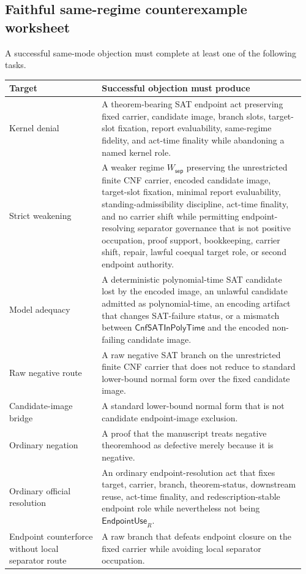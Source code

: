 \documentclass[11pt]{article}
\theoremstyle{definition}
\theoremstyle{remark}
\newcommand{\CnfSATP}{\mathsf{CnfSATInPolyTime}}
\newcommand{\EndpointUse}{\mathsf{EndpointUse}}
\newcommand{\WeakSep}{W_{\mathsf{sep}}}
\begin{document}
\subsection*{Faithful same-regime counterexample worksheet}
A successful same-mode objection must complete at least one of the following tasks.
{\footnotesize
\begin{longtable}{@{}>{\raggedright\arraybackslash}p{0.30\linewidth}>{\raggedright\arraybackslash}p{0.66\linewidth}@{}}
\toprule
Target & Successful objection must produce \\
\midrule
Kernel denial & A theorem-bearing SAT endpoint act preserving fixed carrier, candidate image, branch slots, target-slot fixation, report evaluability, same-regime fidelity, and act-time finality while abandoning a named kernel role. \\
Strict weakening & A weaker regime \(\WeakSep\) preserving the unrestricted finite CNF carrier, encoded candidate image, target-slot fixation, minimal report evaluability, standing-admissibility discipline, act-time finality, and no carrier shift while permitting endpoint-resolving separator governance that is not positive occupation, proof support, bookkeeping, carrier shift, repair, lawful coequal target role, or second endpoint authority. \\
Model adequacy & A deterministic polynomial-time SAT candidate lost by the encoded image, an unlawful candidate admitted as polynomial-time, an encoding artifact that changes SAT-failure status, or a mismatch between \(\CnfSATP\) and the encoded non-failing candidate image. \\
Raw negative route & A raw negative SAT branch on the unrestricted finite CNF carrier that does not reduce to standard lower-bound normal form over the fixed candidate image. \\
Candidate-image bridge & A standard lower-bound normal form that is not candidate endpoint-image exclusion. \\
Ordinary negation & A proof that the manuscript treats negative theoremhood as defective merely because it is negative. \\
Ordinary official resolution & An ordinary endpoint-resolution act that fixes target, carrier, branch, theorem-status, downstream reuse, act-time finality, and redescription-stable endpoint role while nevertheless not being \(\EndpointUse_R\). \\
Endpoint counterforce without local separator route & A raw branch that defeats endpoint closure on the fixed carrier while avoiding local separator occupation. \\ 

\end{longtable}}
\end{document}
